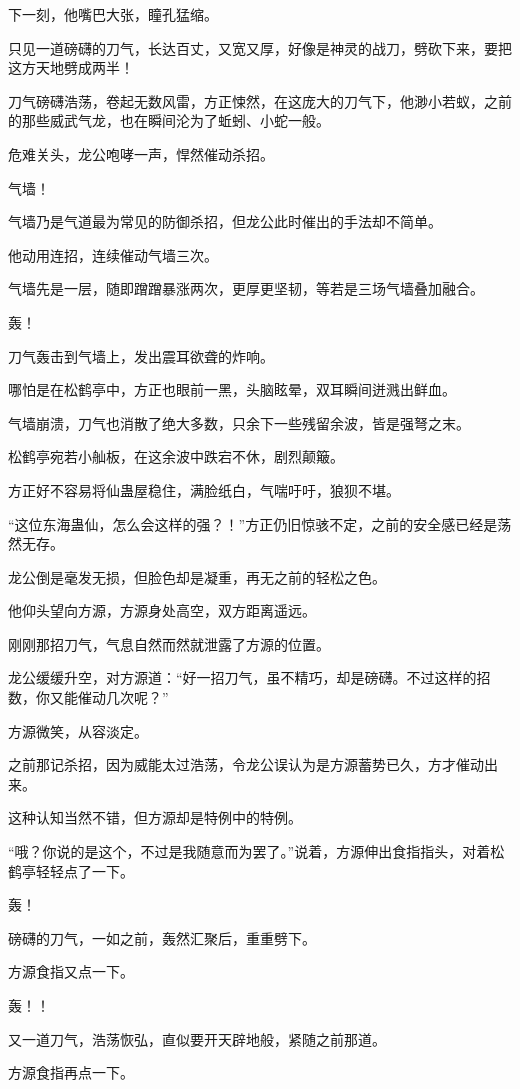\begin{this_body}
下一刻，他嘴巴大张，瞳孔猛缩。

只见一道磅礴的刀气，长达百丈，又宽又厚，好像是神灵的战刀，劈砍下来，要把这方天地劈成两半！

刀气磅礴浩荡，卷起无数风雷，方正悚然，在这庞大的刀气下，他渺小若蚁，之前的那些威武气龙，也在瞬间沦为了蚯蚓、小蛇一般。

危难关头，龙公咆哮一声，悍然催动杀招。

气墙！

气墙乃是气道最为常见的防御杀招，但龙公此时催出的手法却不简单。

他动用连招，连续催动气墙三次。

气墙先是一层，随即蹭蹭暴涨两次，更厚更坚韧，等若是三场气墙叠加融合。

轰！

刀气轰击到气墙上，发出震耳欲聋的炸响。

哪怕是在松鹤亭中，方正也眼前一黑，头脑眩晕，双耳瞬间迸溅出鲜血。

气墙崩溃，刀气也消散了绝大多数，只余下一些残留余波，皆是强弩之末。

松鹤亭宛若小舢板，在这余波中跌宕不休，剧烈颠簸。

方正好不容易将仙蛊屋稳住，满脸纸白，气喘吁吁，狼狈不堪。

“这位东海蛊仙，怎么会这样的强？！”方正仍旧惊骇不定，之前的安全感已经是荡然无存。

龙公倒是毫发无损，但脸色却是凝重，再无之前的轻松之色。

他仰头望向方源，方源身处高空，双方距离遥远。

刚刚那招刀气，气息自然而然就泄露了方源的位置。

龙公缓缓升空，对方源道：“好一招刀气，虽不精巧，却是磅礴。不过这样的招数，你又能催动几次呢？”

方源微笑，从容淡定。

之前那记杀招，因为威能太过浩荡，令龙公误认为是方源蓄势已久，方才催动出来。

这种认知当然不错，但方源却是特例中的特例。

“哦？你说的是这个，不过是我随意而为罢了。”说着，方源伸出食指指头，对着松鹤亭轻轻点了一下。

轰！

磅礴的刀气，一如之前，轰然汇聚后，重重劈下。

方源食指又点一下。

轰！！

又一道刀气，浩荡恢弘，直似要开天辟地般，紧随之前那道。

方源食指再点一下。


\end{this_body}
